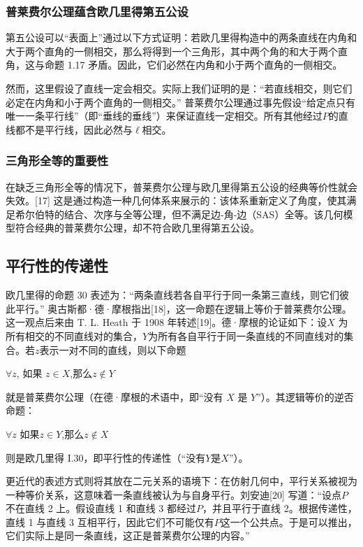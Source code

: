 \subsubsection{普莱费尔公理蕴含欧几里得第五公设}
第五公设可以“表面上”通过以下方式证明：若欧几里得构造中的两条直线在内角和大于两个直角的一侧相交，那么将得到一个三角形，其中两个角的和大于两个直角，这与命题 1.17 矛盾。因此，它们必然在内角和小于两个直角的一侧相交。

然而，这里假设了直线一定会相交。实际上我们证明的是：“若直线相交，则它们必定在内角和小于两个直角的一侧相交。” 普莱费尔公理通过事先假设“给定点只有唯一一条平行线”（即“垂线的垂线”）来保证直线一定相交。所有其他经过$P$的直线都不是平行线，因此必然与$\ell$相交。
\subsubsection{三角形全等的重要性}
在缺乏三角形全等的情况下，普莱费尔公理与欧几里得第五公设的经典等价性就会失效。[17] 这是通过构造一种几何体系来展示的：该体系重新定义了角度，使其满足希尔伯特的结合、次序与全等公理，但不满足边-角-边（SAS）全等。该几何模型符合经典的普莱费尔公理，却不符合欧几里得第五公设。
\subsection{平行性的传递性}
欧几里得的命题 30 表述为：“两条直线若各自平行于同一条第三直线，则它们彼此平行。” 奥古斯都·德·摩根指出[18]，这一命题在逻辑上等价于普莱费尔公理。这一观点后来由 T. L. Heath 于 1908 年转述[19]。德·摩根的论证如下：设$X$ 为所有相交的不同直线对的集合，$Y$为所有各自平行于同一条直线的不同直线对的集合。若$z$表示一对不同的直线，则以下命题

$\forall z$, 如果 $z \in X$,那么$z \notin Y$~

就是普莱费尔公理（在德·摩根的术语中，即“没有 $X$ 是 $Y$”）。其逻辑等价的逆否命题：

$\forall z$ 如果$z \in Y$,那么$z \notin X$

则是欧几里得 I.30，即平行性的传递性（“没有$Y$是$X$”）。

更近代的表述方式则将其放在二元关系的语境下：在仿射几何中，平行关系被视为一种等价关系，这意味着一条直线被认为与自身平行。刘安迪[20] 写道：“设点$P$不在直线 2 上。假设直线 1 和直线 3 都经过$P$，并且平行于直线 2。根据传递性，直线 1 与直线 3 互相平行，因此它们不可能仅有$P$这一个公共点。于是可以推出，它们实际上是同一条直线，这正是普莱费尔公理的内容。”
